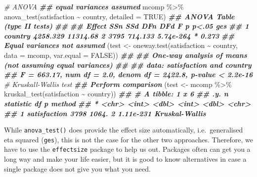 \documentclass[
]{book}
\newenvironment{Shaded}{\begin{snugshade}}{\end{snugshade}}
\newcommand{\AttributeTok}[1]{\textcolor[rgb]{0.77,0.63,0.00}{#1}}
\newcommand{\CommentTok}[1]{\textcolor[rgb]{0.56,0.35,0.01}{\textit{#1}}}
\newcommand{\ConstantTok}[1]{\textcolor[rgb]{0.00,0.00,0.00}{#1}}
\newcommand{\DocumentationTok}[1]{\textcolor[rgb]{0.56,0.35,0.01}{\textbf{\textit{#1}}}}
\newcommand{\FunctionTok}[1]{\textcolor[rgb]{0.00,0.00,0.00}{#1}}
\newcommand{\NormalTok}[1]{#1}
\newcommand{\OtherTok}[1]{\textcolor[rgb]{0.56,0.35,0.01}{#1}}
\newcommand{\SpecialCharTok}[1]{\textcolor[rgb]{0.00,0.00,0.00}{#1}}
\begin{document}
\begin{Shaded}
\begin{Highlighting}[]
\CommentTok{\# ANOVA}
\DocumentationTok{\#\# equal variances assumed}
\NormalTok{mcomp }\SpecialCharTok{\%\textgreater{}\%}
  \FunctionTok{anova\_test}\NormalTok{(satisfaction }\SpecialCharTok{\textasciitilde{}}\NormalTok{ country,}
              \AttributeTok{detailed =} \ConstantTok{TRUE}\NormalTok{)}
\DocumentationTok{\#\# ANOVA Table (type II tests)}
\DocumentationTok{\#\# }
\DocumentationTok{\#\#    Effect      SSn      SSd DFn  DFd       F         p p\textless{}.05   ges}
\DocumentationTok{\#\# 1 country 4258.329 11314.68   2 3795 714.133 5.74e{-}264     * 0.273}
\DocumentationTok{\#\# Equal variances not assumed}
\NormalTok{(test }\OtherTok{\textless{}{-}} \FunctionTok{oneway.test}\NormalTok{(satisfaction }\SpecialCharTok{\textasciitilde{}}\NormalTok{ country,}
            \AttributeTok{data =}\NormalTok{ mcomp,}
            \AttributeTok{var.equal =} \ConstantTok{FALSE}\NormalTok{))}
\DocumentationTok{\#\# }
\DocumentationTok{\#\#  One{-}way analysis of means (not assuming equal variances)}
\DocumentationTok{\#\# }
\DocumentationTok{\#\# data:  satisfaction and country}
\DocumentationTok{\#\# F = 663.17, num df = 2.0, denom df = 2422.8, p{-}value \textless{} 2.2e{-}16}
\CommentTok{\# Kruskall{-}Wallis test}
\DocumentationTok{\#\# Perform comparison}
\NormalTok{(test }\OtherTok{\textless{}{-}}\NormalTok{ mcomp }\SpecialCharTok{\%\textgreater{}\%}
  \FunctionTok{kruskal\_test}\NormalTok{(satisfaction }\SpecialCharTok{\textasciitilde{}}\NormalTok{ country))}
\DocumentationTok{\#\# \# A tibble: 1 x 6}
\DocumentationTok{\#\#   .y.              n statistic    df         p method        }
\DocumentationTok{\#\# * \textless{}chr\textgreater{}        \textless{}int\textgreater{}     \textless{}dbl\textgreater{} \textless{}int\textgreater{}     \textless{}dbl\textgreater{} \textless{}chr\textgreater{}         }
\DocumentationTok{\#\# 1 satisfaction  3798     1064.     2 1.11e{-}231 Kruskal{-}Wallis}
\end{Highlighting}
\end{Shaded}

While \texttt{anova\_test()} does provide the effect size automatically, i.e.~generalised eta squared (\texttt{ges}), this is not the case for the other two approaches. Therefore, we have to use the \texttt{effectsize} package to help us out. Packages often can get you a long way and make your life easier, but it is good to know alternatives in case a single package does not give you what you need.
\end{document}
